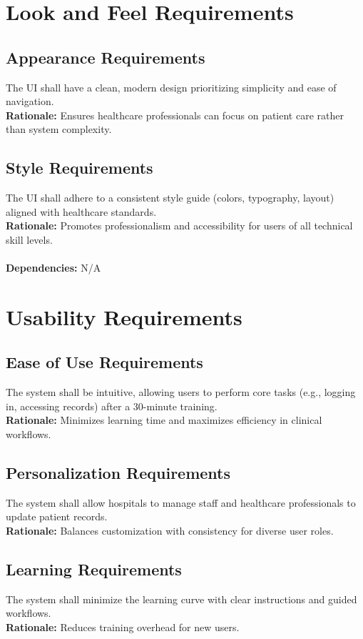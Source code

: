 \documentclass[12pt]{article}
\begin{document}
  \section{Look and Feel Requirements} \label{NFR_LookAndFeel}
\subsection{Appearance Requirements}
The UI shall have a clean, modern design prioritizing simplicity and ease of navigation. \\ 
\textbf{Rationale:} Ensures healthcare professionals can focus on patient care rather than system complexity. 

\subsection{Style Requirements}
The UI shall adhere to a consistent style guide (colors, typography, layout) aligned with healthcare standards. \\ 
\textbf{Rationale:} Promotes professionalism and accessibility for users of all technical skill levels. \\
  \\
\textbf{Dependencies:} N/A

\section{Usability Requirements} \label{NFR_Usability}
\subsection{Ease of Use Requirements}
The system shall be intuitive, allowing users to perform core tasks (e.g., logging in, accessing records) after a 30-minute training.  \\
\textbf{Rationale:} Minimizes learning time and maximizes efficiency in clinical workflows.

\subsection{Personalization Requirements}
The system shall allow hospitals to manage staff and healthcare professionals to update patient records. \\ 
\textbf{Rationale:} Balances customization with consistency for diverse user roles.

\subsection{Learning Requirements}
The system shall minimize the learning curve with clear instructions and guided workflows.  \\
\textbf{Rationale:} Reduces training overhead for new users.
\end{document}
